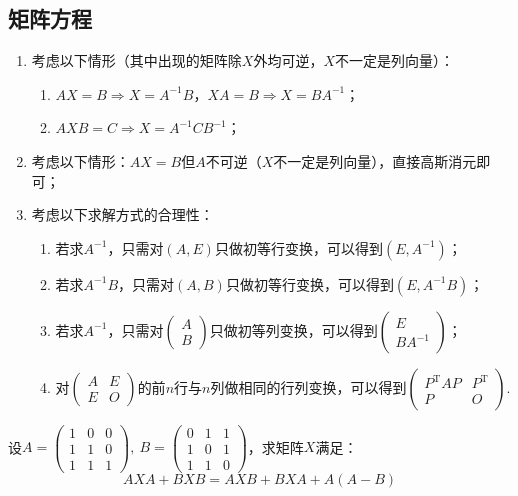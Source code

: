 \subsection{矩阵方程}
\begin{enumerate}
	\item 考虑以下情形（其中出现的矩阵除$X$外均可逆，$X$不一定是列向量）：
	\begin{enumerate}
		\item $AX=B \Rightarrow X=A^{-1}B$，$XA=B \Rightarrow X=BA^{-1}$；
		\item $AXB=C \Rightarrow X=A^{-1}CB^{-1}$；
	\end{enumerate}
	\item 考虑以下情形：$AX=B$但$A$不可逆（$X$不一定是列向量），直接高斯消元即可；
	\item 考虑以下求解方式的合理性：
	\begin{enumerate}
		\item 若求$A^{-1}$，只需对$(A,E)$只做初等行变换，可以得到$(E,A^{-1})$；
		\item 若求$A^{-1}B$，只需对$(A,B)$只做初等行变换，可以得到$(E,A^{-1}B)$；
		\item 若求$A^{-1}$，只需对$\begin{pmatrix}
			A \\ B
		\end{pmatrix}$只做初等列变换，可以得到$\begin{pmatrix}
			E \\ BA^{-1}
		\end{pmatrix}$；
		\item 对$\begin{pmatrix}
			A & E \\ E & O
		\end{pmatrix}$的前$n$行与$n$列做相同的行列变换，可以得到$\begin{pmatrix}
			P^\mathrm{T}AP & P^\mathrm{T} \\ P & O
		\end{pmatrix}$.
	\end{enumerate}
\end{enumerate}

\begin{example}
	设$A=\begin{pmatrix}1 & 0 & 0 \\ 1 & 1 & 0 \\ 1 & 1 & 1\end{pmatrix},\ 
	B=\begin{pmatrix}0 & 1 & 1 \\ 1 & 0 & 1 \\ 1 & 1 & 0\end{pmatrix}$，求矩阵$X$满足：	
	$$AXA+BXB=AXB+BXA+A(A-B)$$
\end{example}

